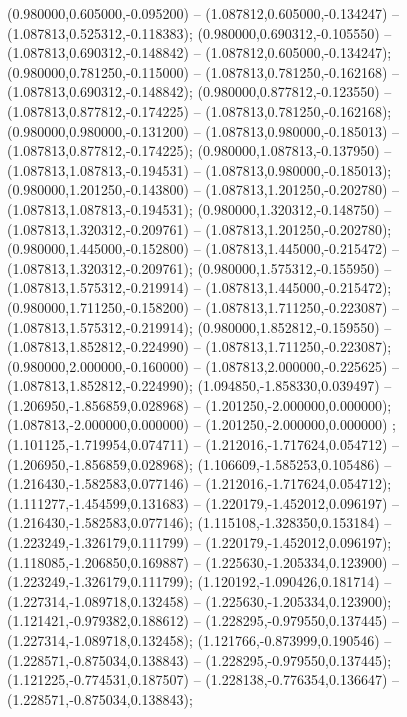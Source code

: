  (0.980000,0.605000,-0.095200) -- (1.087812,0.605000,-0.134247) -- (1.087813,0.525312,-0.118383);
 (0.980000,0.690312,-0.105550) -- (1.087813,0.690312,-0.148842) -- (1.087812,0.605000,-0.134247);
 (0.980000,0.781250,-0.115000) -- (1.087813,0.781250,-0.162168) -- (1.087813,0.690312,-0.148842);
 (0.980000,0.877812,-0.123550) -- (1.087813,0.877812,-0.174225) -- (1.087813,0.781250,-0.162168);
 (0.980000,0.980000,-0.131200) -- (1.087813,0.980000,-0.185013) -- (1.087813,0.877812,-0.174225);
 (0.980000,1.087813,-0.137950) -- (1.087813,1.087813,-0.194531) -- (1.087813,0.980000,-0.185013);
 (0.980000,1.201250,-0.143800) -- (1.087813,1.201250,-0.202780) -- (1.087813,1.087813,-0.194531);
 (0.980000,1.320312,-0.148750) -- (1.087813,1.320312,-0.209761) -- (1.087813,1.201250,-0.202780);
 (0.980000,1.445000,-0.152800) -- (1.087813,1.445000,-0.215472) -- (1.087813,1.320312,-0.209761);
 (0.980000,1.575312,-0.155950) -- (1.087813,1.575312,-0.219914) -- (1.087813,1.445000,-0.215472);
 (0.980000,1.711250,-0.158200) -- (1.087813,1.711250,-0.223087) -- (1.087813,1.575312,-0.219914);
 (0.980000,1.852812,-0.159550) -- (1.087813,1.852812,-0.224990) -- (1.087813,1.711250,-0.223087);
 (0.980000,2.000000,-0.160000) -- (1.087813,2.000000,-0.225625) -- (1.087813,1.852812,-0.224990);
 (1.094850,-1.858330,0.039497) -- (1.206950,-1.856859,0.028968) -- (1.201250,-2.000000,0.000000);
 (1.087813,-2.000000,0.000000) -- (1.201250,-2.000000,0.000000) ;
 (1.101125,-1.719954,0.074711) -- (1.212016,-1.717624,0.054712) -- (1.206950,-1.856859,0.028968);
 (1.106609,-1.585253,0.105486) -- (1.216430,-1.582583,0.077146) -- (1.212016,-1.717624,0.054712);
 (1.111277,-1.454599,0.131683) -- (1.220179,-1.452012,0.096197) -- (1.216430,-1.582583,0.077146);
 (1.115108,-1.328350,0.153184) -- (1.223249,-1.326179,0.111799) -- (1.220179,-1.452012,0.096197);
 (1.118085,-1.206850,0.169887) -- (1.225630,-1.205334,0.123900) -- (1.223249,-1.326179,0.111799);
 (1.120192,-1.090426,0.181714) -- (1.227314,-1.089718,0.132458) -- (1.225630,-1.205334,0.123900);
 (1.121421,-0.979382,0.188612) -- (1.228295,-0.979550,0.137445) -- (1.227314,-1.089718,0.132458);
 (1.121766,-0.873999,0.190546) -- (1.228571,-0.875034,0.138843) -- (1.228295,-0.979550,0.137445);
 (1.121225,-0.774531,0.187507) -- (1.228138,-0.776354,0.136647) -- (1.228571,-0.875034,0.138843);
